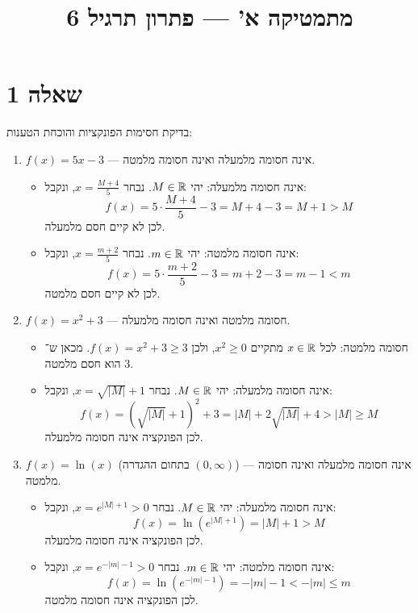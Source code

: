 

\usepackage{pgfplots}
\pgfplotsset{compat=1.18}

\title{מתמטיקה א' --- פתרון תרגיל 6}
\date{}



\maketitle

\section{שאלה 1}
בדיקת חסימות הפונקציות והוכחת הטענות:
\begin{enumerate}
	\item $f(x) = 5x - 3$ --- אינה חסומה מלמעלה ואינה חסומה מלמטה.
		\begin{itemize}
			\item אינה חסומה מלמעלה: יהי $M \in \mathbb{R}$. נבחר $x = \frac{M + 4}{5}$, ונקבל:
				\[
					f(x) = 5 \cdot \frac{M + 4}{5} - 3 = M + 4 - 3 = M + 1 > M
				\]
				לכן לא קיים חסם מלמעלה.
			\item אינה חסומה מלמטה: יהי $m \in \mathbb{R}$. נבחר $x = \frac{m + 2}{5}$, ונקבל:
				\[
					f(x) = 5 \cdot \frac{m + 2}{5} - 3 = m + 2 - 3 = m - 1 < m
				\]
				לכן לא קיים חסם מלמטה.
		\end{itemize}

	\item $f(x) = x^2 + 3$ --- חסומה מלמטה ואינה חסומה מלמעלה.
		\begin{itemize}
			\item חסומה מלמטה: לכל $x \in \mathbb{R}$ מתקיים $x^2 \ge 0$, ולכן $f(x) = x^2 + 3 \ge 3$. מכאן ש־$3$ הוא חסם מלמטה.
			\item אינה חסומה מלמעלה: יהי $M \in \mathbb{R}$. נבחר $x = \sqrt{|M|} + 1$, ונקבל:
				\[
					f(x) = {\left(\sqrt{|M|} + 1\right)}^2 + 3 = |M| + 2\sqrt{|M|} + 4 > |M| \ge M
				\]
				לכן הפונקציה אינה חסומה מלמעלה.
		\end{itemize}

	\item $f(x) = \ln(x)$ (בתחום ההגדרה $(0, \infty)$) --- אינה חסומה מלמעלה ואינה חסומה מלמטה.
		\begin{itemize}
			\item אינה חסומה מלמעלה: יהי $M \in \mathbb{R}$. נבחר $x = e^{|M| + 1} > 0$, ונקבל:
				\[
					f(x) = \ln\left(e^{|M| + 1}\right) = |M| + 1 > M
				\]
				לכן הפונקציה אינה חסומה מלמעלה.
			\item אינה חסומה מלמטה: יהי $m \in \mathbb{R}$. נבחר $x = e^{-|m| - 1} > 0$, ונקבל:
				\[
					f(x) = \ln\left(e^{-|m| - 1}\right) = -|m| - 1 < -|m| \le m
				\]
				לכן הפונקציה אינה חסומה מלמטה.
		\end{itemize}


\end{enumerate}
